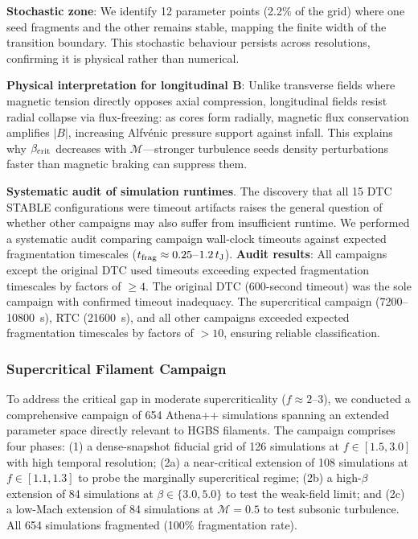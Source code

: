 \documentclass[twocolumn]{mnras}
\begin{document}
\textbf{Stochastic zone}: We identify 12 parameter points (2.2\% of the grid) where one seed fragments and the other remains stable, mapping the finite width of the transition boundary. This stochastic behaviour persists across resolutions, confirming it is physical rather than numerical.

\textbf{Physical interpretation for longitudinal B}: Unlike transverse fields where magnetic tension directly opposes axial compression, longitudinal fields resist radial collapse via flux-freezing: as cores form radially, magnetic flux conservation amplifies $|B|$, increasing Alfv\'enic pressure support against infall. This explains why $\beta_{\rm crit}$ decreases with $\mathcal{M}$---stronger turbulence seeds density perturbations faster than magnetic braking can suppress them.

\textbf{Systematic audit of simulation runtimes}. The discovery that all 15 DTC STABLE configurations were timeout artifacts raises the general question of whether other campaigns may also suffer from insufficient runtime. We performed a systematic audit comparing campaign wall-clock timeouts against expected fragmentation timescales ($t_{\rm frag} \approx 0.25$--$1.2\,t_{\rm J}$). \textbf{Audit results}: All campaigns except the original DTC used timeouts exceeding expected fragmentation timescales by factors of $\geq 4$. The original DTC (600-second timeout) was the sole campaign with confirmed timeout inadequacy. The supercritical campaign (7200--10800~s), RTC (21600~s), and all other campaigns exceeded expected fragmentation timescales by factors of $>10$, ensuring reliable classification.

\subsubsection{Supercritical Filament Campaign}
\label{sec:supercrit}

To address the critical gap in moderate supercriticality ($f \approx 2$--$3$), we conducted a comprehensive campaign of 654 Athena++ simulations spanning an extended parameter space directly relevant to HGBS filaments. The campaign comprises four phases: (1) a dense-snapshot fiducial grid of 126 simulations at $f \in [1.5, 3.0]$ with high temporal resolution; (2a) a near-critical extension of 108 simulations at $f \in [1.1, 1.3]$ to probe the marginally supercritical regime; (2b) a high-$\beta$ extension of 84 simulations at $\beta \in \{3.0, 5.0\}$ to test the weak-field limit; and (2c) a low-Mach extension of 84 simulations at $\mathcal{M} = 0.5$ to test subsonic turbulence. All 654 simulations fragmented (100\% fragmentation rate).
\end{document}
